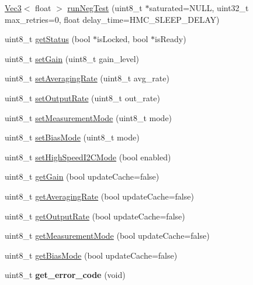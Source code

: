 \begin{DoxyCompactItemize}
\item 
\hyperlink{struct_vec3}{Vec3}$<$ float $>$ \hyperlink{class_h_m_c5883_l_a6285036cc2d7c6f320b5eda766cf71e5}{run\+Neg\+Test} (uint8\+\_\+t $\ast$saturated=N\+U\+L\+L, uint32\+\_\+t max\+\_\+retries=0, float delay\+\_\+time=H\+M\+C\+\_\+\+S\+L\+E\+E\+P\+\_\+\+D\+E\+L\+A\+Y)
\item 
uint8\+\_\+t \hyperlink{class_h_m_c5883_l_ad68af7d6a31a0ab313c6aa887512f861}{get\+Status} (bool $\ast$is\+Locked, bool $\ast$is\+Ready)
\item 
uint8\+\_\+t \hyperlink{class_h_m_c5883_l_ac5d70ea9d043a7829d3410b6ed42d72d}{set\+Gain} (uint8\+\_\+t gain\+\_\+level)
\item 
uint8\+\_\+t \hyperlink{class_h_m_c5883_l_aed6ab6cfe07eafee7d99012dc092e41d}{set\+Averaging\+Rate} (uint8\+\_\+t avg\+\_\+rate)
\item 
uint8\+\_\+t \hyperlink{class_h_m_c5883_l_a5c4eda2a75638936d50b25484b96147f}{set\+Output\+Rate} (uint8\+\_\+t out\+\_\+rate)
\item 
uint8\+\_\+t \hyperlink{class_h_m_c5883_l_a6d584d734dfe62dad7ac7e32174285e9}{set\+Measurement\+Mode} (uint8\+\_\+t mode)
\item 
uint8\+\_\+t \hyperlink{class_h_m_c5883_l_af5b858a870f8f961d5540a18393eabf0}{set\+Bias\+Mode} (uint8\+\_\+t mode)
\item 
uint8\+\_\+t \hyperlink{class_h_m_c5883_l_a44596be4b636171ac21f3b80a6f46ee0}{set\+High\+Speed\+I2\+C\+Mode} (bool enabled)
\item 
uint8\+\_\+t \hyperlink{class_h_m_c5883_l_aec9eb6926b5f7461abbad1a63943071f}{get\+Gain} (bool update\+Cache=false)
\item 
uint8\+\_\+t \hyperlink{class_h_m_c5883_l_a6652a9c55333f6fd2aac541f57a692fc}{get\+Averaging\+Rate} (bool update\+Cache=false)
\item 
uint8\+\_\+t \hyperlink{class_h_m_c5883_l_a2106f4efb55ac430b77b72485b9e57d6}{get\+Output\+Rate} (bool update\+Cache=false)
\item 
uint8\+\_\+t \hyperlink{class_h_m_c5883_l_a4c29ddea7f0e5e142054944cfdae0ed5}{get\+Measurement\+Mode} (bool update\+Cache=false)
\item 
uint8\+\_\+t \hyperlink{class_h_m_c5883_l_a3dee47519218c6d46c8c1c3121c5948b}{get\+Bias\+Mode} (bool update\+Cache=false)
\item 
\hypertarget{class_h_m_c5883_l_a1f5045a220b5ed476f8eb38915c6571a}{uint8\+\_\+t {\bfseries get\+\_\+error\+\_\+code} (void)}\label{class_h_m_c5883_l_a1f5045a220b5ed476f8eb38915c6571a}

\end{DoxyCompactItemize}
